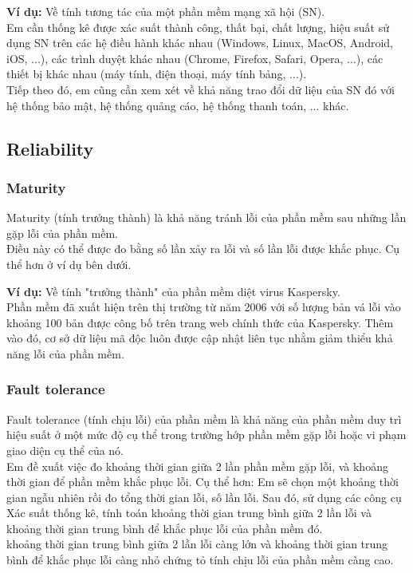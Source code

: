 \documentclass[14pt]{extarticle}
\begin{document}
\textbf{Ví dụ:} Về tính tương tác của một phần mềm mạng xã hội (SN).\\
Em cần thống kê được xác suất thành công, thất bại, chất lượng, hiệu suất
sử dụng SN trên các hệ điều hành khác nhau
(Windows, Linux, MacOS, Android, iOS, ...), các trình duyệt khác nhau
(Chrome, Firefox, Safari, Opera, ...), các thiết bị khác nhau
(máy tính, điện thoại, máy tính bảng, ...).\\
Tiếp theo đó, em cũng cần xem xét về khả năng trao đổi dữ liệu của SN đó
với hệ thống bảo mật, hệ thống quảng cáo, hệ thống thanh toán, ... khác.


\subsection{Reliability}
\subsubsection{Maturity}
Maturity (tính trưởng thành) là khả năng tránh lỗi của phần mềm
sau những lần gặp lỗi của phần mềm.\\
Điều này có thể được đo bằng số lần xảy ra lỗi và số lần lỗi được khắc phục.
Cụ thể hơn ở ví dụ bên dưới.

\textbf{Ví dụ:} Về tính "trưởng thành" của phần mềm diệt virus Kaspersky.\\
Phần mềm đã xuất hiện trên thị trường từ năm 2006 với
số lượng bản vá lỗi vào khoảng 100 bản được công bố trên trang
web chính thức của Kaspersky. Thêm vào đó, cơ sở dữ liệu mã độc luôn
được cập nhật liên tục nhằm giảm thiểu khả năng lỗi của phần mềm.

\subsubsection{Fault tolerance}
Fault tolerance (tính chịu lỗi) của phần mềm là khả năng của phần mềm
duy trì hiệu suất ở một mức độ cụ thể trong trường hớp phần mềm gặp lỗi
hoặc vi phạm giao diện cụ thể của nó.\\
Em đề xuất việc đo khoảng thời gian giữa 2 lần phần mềm gặp lỗi,
và khoảng thời gian để phần mềm khắc phục lỗi.
Cụ thể hơn: Em sẽ chọn một khoảng thời gian ngẫu nhiên rồi đo tổng thời gian lỗi,
số lần lỗi. Sau đó, sử dụng các công cụ Xác suất thống kê, tính toán
khoảng thời gian trung bình giữa 2 lần lỗi
và khoảng thời gian trung bình để khắc phục lỗi của phần mềm đó.\\
khoảng thời gian trung bình giữa 2 lần lỗi càng lớn
và khoảng thời gian trung bình để khắc phục lỗi càng nhỏ chứng tỏ tính chịu lỗi
của phần mềm càng cao.
\end{document}
